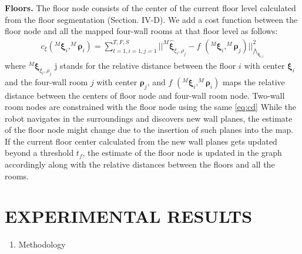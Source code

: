 \documentclass[10pt, letterpaper]{article}
\begin{document}
\begin{multicols*}{2}
\textbf{Floors.} The floor node consists of the center of the current floor level calculated from the floor segmentation (Section. IV-D). We add a cost function between the floor node and
all the mapped four-wall rooms at that floor level as follows:
\begin{equation}
    \begin{aligned}
        {c}_{\xi}(^M \boldsymbol{\xi}_i,^M \boldsymbol{\rho}_i)= \sum_{t=1,i=1,j=1}^{T,F,S} ||^M{\boldsymbol{\hat{\xi}}_{\xi_i,\rho_j}} - \textit{f }(^M \boldsymbol{\xi}_i,^M \boldsymbol{\rho}_j)||_{\boldsymbol{\bigwedge}_{\boldsymbol{\tilde{\xi}}_{i,t}}}^2
    \end{aligned}
    \label{eq:cd}
\end{equation}
where $^M\boldsymbol{\xi}_{\xi_i,\rho_j}$ j stands for the relative distance between the
floor $\textit{i}$ with center $\boldsymbol{\xi}_i$ and the four-wall room $\textit{j}$ with center $\mathbf{\boldsymbol{\rho}}_{j}$, and $\textit{f }(^M \boldsymbol{\xi}_i,^M \boldsymbol{\rho}_i)$ maps the relative distance between the
centers of floor node and four-wall room node. Two-wall room
nodes are constrained with the floor node using the same \cref{eq:cd} While the robot navigates in the surroundings and discovers
new wall planes, the estimate of the floor node might change
due to the insertion of such planes into the map. If the current
floor center calculated from the new wall planes gets updated
beyond a threshold $\textit{t}_f$, the estimate of the floor node is updated
in the graph accordingly along with the relative distances
between the floors and all the rooms.
\section{EXPERIMENTAL RESULTS}
\begin{enumerate}[label=\Alph*.]
    \item Methodology
   
\end{enumerate}
 

\end{multicols*}
\end{document}
